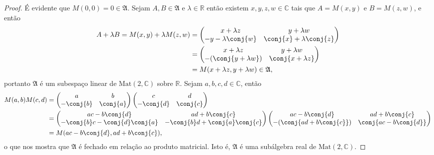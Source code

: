 \begin{proof}
    É evidente que \(M(0,0) = 0 \in \mathfrak{A}\). Sejam \(A, B \in \mathfrak{A}\) e \(\lambda \in \mathbb{R}\) então existem \(x,y,z,w \in \mathbb{C}\) tais que \(A = M(x,y)\) e \(B = M(z,w)\), e então
    \begin{align*}
        A + \lambda B = M(x,y) + \lambda M(z,w) &=
        \begin{pmatrix}
            x + \lambda z & y + \lambda w\\
            -y-\lambda\conj{w} & \conj{x} + \lambda\conj{z}
        \end{pmatrix}\\&=
        \begin{pmatrix}
            x + \lambda z & y + \lambda w\\
            -(\conj{y + \lambda w}) & \conj{x + \lambda z}
        \end{pmatrix}\\
        &= M(x + \lambda z, y + \lambda w) \in \mathfrak{A},
    \end{align*}
    portanto \(\mathfrak{A}\) é um subespaço linear de \(\mathrm{Mat}(2,\mathbb{C})\) sobre \(\mathbb{R}\). Sejam \(a,b,c,d \in \mathbb{C}\), então
    \begin{align*}
        M(a,b)M(c,d) &=
        \begin{pmatrix}
            a & b\\
            -\conj{b} & \conj{a}
        \end{pmatrix}
        \begin{pmatrix}
            c & d\\
            -\conj{d} & \conj{c}
        \end{pmatrix} \\
        &=
        \begin{pmatrix}
            ac - b\conj{d} & ad + b \conj{c}\\
            -\conj{b} c - \conj{d} \conj{a} & -\conj{b} d + \conj{a} \conj{c}
        \end{pmatrix}
        \begin{pmatrix}
            ac - b\conj{d} & ad + b \conj{c}\\
            -(\conj{ad + b\conj{c}}) & \conj{ac - b\conj{d}}
        \end{pmatrix} \\
        &= M(ac - b\conj{d}, ad + b\conj{c}),
    \end{align*}
    o que nos mostra que \(\mathfrak{A}\) é fechado em relação ao produto matricial. Isto é, \(\mathfrak{A}\) é uma subálgebra real de \(\mathrm{Mat}(2, \mathbb{C})\).
\end{proof}

